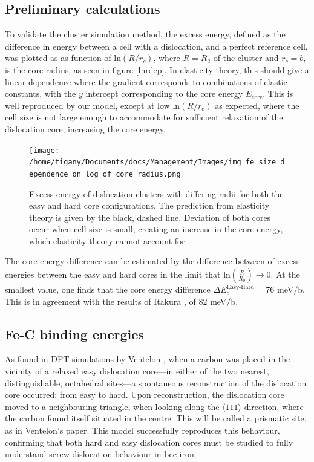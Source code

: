 \documentclass[a4paper,11pt]{article}
\begin{document}
\subsection{Preliminary calculations}
\label{sec:org33c275a}


To validate the cluster simulation method, the excess energy, defined as the difference in energy
between a cell with a dislocation, and a perfect reference cell, was plotted as as function of
\(\text{ln}(R/r_c)\), where \(R = R_2\) of the cluster and \(r_c = b\), is the core radius, as seen in
figure \ref{lnrdep}. In elasticity theory, this should give a linear dependence where the gradient
corresponds to combinations of elastic constants, with the \(y\) intercept corresponding to the
core energy \(E_{\text{core}}\). This is well reproduced by our model, except at low \(\text{ln}(R/r_c)\)
as expected, where the cell size is not large enough to accommodate for sufficient relaxation of
the dislocation core, increasing the core energy.

\begin{figure}[htbp]
\centering
\texttt{[image: /home/tigany/Documents/docs/Management/Images/img\_fe\_size\_dependence\_on\_log\_of\_core\_radius.png]}
\caption{\label{fig:orgca4cab3}
Excess energy of dislocation clusters with differing radii for both the easy and hard core configurations. The prediction from elasticity theory is given by the black, dashed line. Deviation of both cores occur when cell size is small, creating an increase in the core energy, which elasticity theory cannot account for.}
\end{figure}




The core energy difference can be estimated by the difference
between of excess energies between the easy and hard cores in the limit
that \(\text{ln}(\frac{R}{R_0}) \rightarrow 0\). At the smallest
value, one finds that the core energy difference \(\Delta
   E_c^{\text{Easy-Hard}} = 76\) meV/b. This is in agreement with the
results of Itakura \cite{Itakura2012}, of 82 meV/b.



\subsection{Fe-C binding energies}
\label{sec:orga66e49c}



As found in DFT simulations by Ventelon \cite{Ventelon2015}, when a carbon was placed in the
vicinity of a relaxed easy dislocation core---in either of the two nearest, distinguishable,
octahedral sites---a spontaneous reconstruction of the dislocation core occurred: from easy to
hard. Upon reconstruction, the dislocation core moved to a neighbouring triangle, when looking along the \(\langle
   111\rangle\) direction, where the carbon found itself situated in the centre. This will be called a
prismatic site, as in Ventelon's paper. This model successfully
reproduces this behaviour, confirming that both hard and easy dislocation cores must be studied
to fully understand screw dislocation behaviour in bcc iron. 
\end{document}
